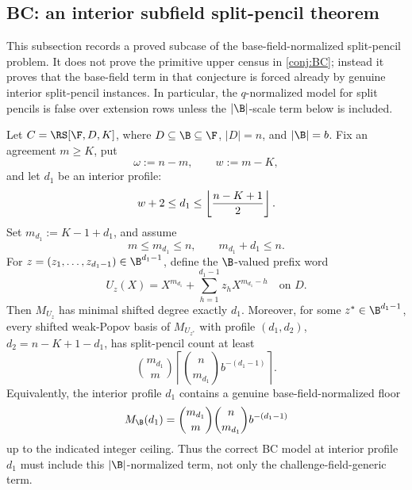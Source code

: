 \subsection{BC: an interior subfield split-pencil theorem}
\label{subsec:bc-next}

This subsection records a proved subcase of the base-field-normalized
split-pencil problem.  It does not prove the primitive upper census in
\cref{conj:BC}; instead it proves that the base-field term in that conjecture
is forced already by genuine interior split-pencil instances.  In particular,
the \(q\)-normalized model for split pencils is false over extension rows
unless the \(|\B|\)-scale term below is included.

\begin{theorem}
\label{thm:bc-interior-prefix-floor}
Let \(C=\RS[\F,D,K]\), where \(D\subseteq\B\subseteq\F\), \(|D|=n\), and
\(|\B|=b\).  Fix an agreement \(m\ge K\), put
\[
        \omega:=n-m,\qquad w:=m-K,
\]
and let \(d_1\) be an interior profile:
\[
        w+2\le d_1\le \left\lfloor {n-K+1\over2}\right\rfloor .
\]
Set \(m_{d_1}:=K-1+d_1\), and assume
\[
        m\le m_{d_1}\le n,\qquad        m_{d_1}+d_1\le n .
\]
For \(z=(z_1,\ldots,z_{d_1-1})\in\B^{d_1-1}\), define the
\(\B\)-valued prefix word
\[
        U_z(X)=X^{m_{d_1}}+\sum_{h=1}^{d_1-1}z_hX^{m_{d_1}-h}
        \quad\text{on }D .
\]
Then \(M_{U_z}\) has minimal shifted degree exactly \(d_1\).  Moreover, for
some \(z^*\in\B^{d_1-1}\), every shifted weak-Popov basis of \(M_{U_{z^*}}\)
with profile \((d_1,d_2)\), \(d_2=n-K+1-d_1\), has split-pencil count at
least
\[
        \binom{m_{d_1}}m
        \left\lceil \binom n{m_{d_1}} b^{-(d_1-1)}\right\rceil .
\]
Equivalently, the interior profile \(d_1\) contains a genuine
base-field-normalized floor
\[
        M_{\B}(d_1)
        =
        \binom{m_{d_1}}m\binom n{m_{d_1}}b^{-(d_1-1)}
\]
up to the indicated integer ceiling.  Thus the correct BC model at interior
profile \(d_1\) must include this \(|\B|\)-normalized term, not only the
challenge-field-generic term.
\end{theorem}

